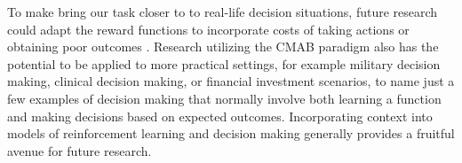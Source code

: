 \documentclass[a4paper,natbib]{apa6}
\begin{document}
To make bring our task closer to to real-life decision situations, future research could adapt the reward functions to incorporate costs of taking actions or obtaining poor outcomes \citep[see][]{schulz2016better}. Research utilizing the CMAB paradigm also has the potential to be applied to more practical settings, for example military decision making, clinical decision making, or financial investment scenarios, to name just a few examples of decision making that normally involve both learning a function and making decisions based on expected outcomes. Incorporating context into models of reinforcement learning and decision making generally provides a fruitful avenue for future research.



\end{document}
